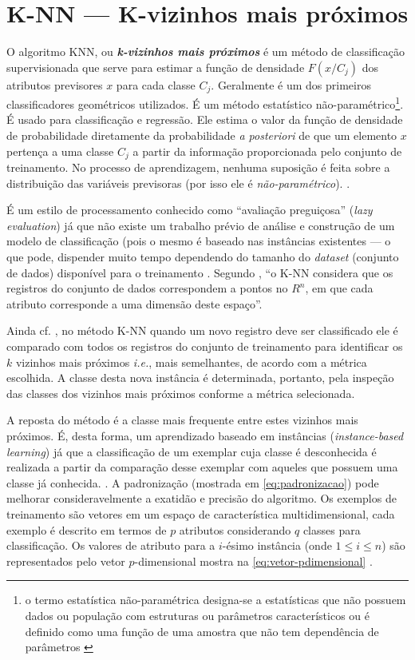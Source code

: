 \section{K-NN --- K-vizinhos mais próximos}\label{sec:knn}
O algoritmo KNN, ou \textit{\textbf{k-vizinhos mais próximos}} é um método de classificação supervisionada que serve para estimar a função de densidade $ F(x/C_j) $ dos atributos previsores $ x $ para cada classe $ C_j $. Geralmente é um dos primeiros classificadores geométricos utilizados. É um método estatístico não-paramétrico\footnote{o termo estatística não-paramétrica designa-se a estatísticas que não possuem dados ou população com estruturas ou parâmetros característicos ou é definido como uma função de uma amostra que não tem dependência de parâmetros \cite{bruce_estatistica_2019}}. É usado para classificação e regressão. Ele estima o valor da função de densidade de probabilidade diretamente da probabilidade \textit{a posteriori} de que um elemento $x$ pertença a uma classe $C_j$ a partir da informação proporcionada pelo conjunto de treinamento. No processo de aprendizagem, nenhuma suposição é feita sobre a distribuição das variáveis previsoras (por isso ele é \textit{não-paramétrico}). \cite{Boscarioli2017, goldschmidt2005, wu2007, bruce_estatistica_2019}. 

É um estilo de processamento conhecido como ``avaliação preguiçosa'' (\textit{lazy evaluation}) já que não existe um trabalho prévio de análise e construção de um modelo de classificação (pois o mesmo é baseado nas instâncias existentes --- o que pode, dispender muito tempo dependendo do tamanho do \textit{dataset} (conjunto de dados) disponível para o treinamento \cite{Boscarioli2017}. Segundo \cite{goldschmidt2005}, ``o K-NN considera que os registros do conjunto de dados correspondem a pontos no $R^n$, em que cada atributo corresponde a uma dimensão deste espaço''.

Ainda cf. , no método K-NN quando um novo registro deve ser classificado ele é comparado com todos os registros do conjunto de treinamento para identificar os $k$ vizinhos mais próximos  \textit{i.e.}, mais semelhantes, de acordo com a métrica escolhida. A classe desta nova instância é determinada, portanto, pela inspeção das classes dos vizinhos mais próximos conforme a métrica selecionada. 

A reposta do método é a classe mais frequente entre estes vizinhos mais próximos. É, desta forma, um aprendizado baseado em instâncias (\textit{instance-based learning}) já que a classificação de um exemplar cuja classe é desconhecida é realizada a partir da comparação desse exemplar com aqueles que possuem uma classe já conhecida. \cite[p. 80]{Boscarioli2017}. A padronização (mostrada em \autoref{eq:padronizacao}) pode melhorar consideravelmente a exatidão e precisão do algoritmo. Os exemplos de treinamento são vetores em um espaço de característica multidimensional, cada exemplo é descrito em termos de $p$ atributos considerando $q$  classes para classificação. Os valores de atributo para a  $i$-ésimo instância (onde $1 \leq i \leq n$) são representados pelo vetor $p$-dimensional mostra na \autoref{eq:vetor-pdimensional} \cite{bruce_estatistica_2019, alpaydin_introduction_2014, classification2013}.


